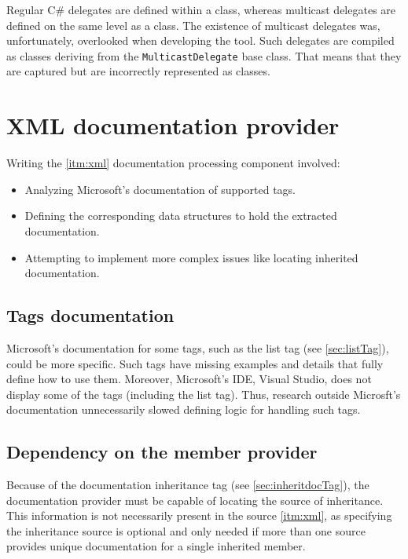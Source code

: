 Regular C\# delegates are defined within a class, whereas multicast delegates are defined on the same level as a class.
The existence of multicast delegates was, unfortunately, overlooked when developing the tool.
Such delegates are compiled as classes deriving from the \lstinline[language=csh]{MulticastDelegate} base class.
That means that they are captured but are incorrectly represented as classes.

\section{XML documentation provider}

Writing the \ref{itm:xml} documentation processing component involved:
\begin{itemize}
    \item Analyzing Microsoft's documentation of supported tags.
    \item Defining the corresponding data structures to hold the extracted documentation.
    \item Attempting to implement more complex issues like locating inherited documentation.
\end{itemize}

\subsection{Tags documentation}

Microsoft's documentation for some tags, such as the list tag (see \ref{sec:listTag}), could be more specific. Such tags have missing examples and details that fully define how to use them. Moreover, Microsoft's IDE, Visual Studio, does not display some of the tags (including the list tag). Thus, research outside Microsft's documentation unnecessarily slowed defining logic for handling such tags.

\subsection{Dependency on the member provider}

Because of the documentation inheritance tag (see \ref{sec:inheritdocTag}), the documentation provider must be capable of locating the source of inheritance. This information is not necessarily present in the source \ref{itm:xml}, as specifying the inheritance source is optional and only needed if more than one source provides unique documentation for a single inherited member.

